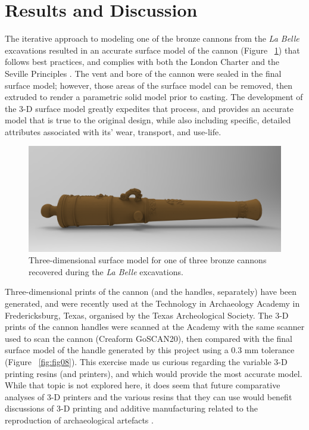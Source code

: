 \documentclass[review]{elsarticle}
\begin{document}
\section*{Results and Discussion}

The iterative approach to modeling one of the bronze cannons from the \textit{La Belle} excavations resulted in an accurate surface model of the cannon (Figure ~\ref{fig:fig07}) that follows best practices, and complies with both the London Charter \citep{RN5872} and the Seville Principles \citep{RN5873}. The vent and bore of the cannon were sealed in the final surface model; however, those areas of the surface model can be removed, then extruded to render a parametric solid model prior to casting. The development of the 3-D surface model greatly expedites that process, and provides an accurate model that is true to the original design, while also including specific, detailed attributes associated with its' wear, transport, and use-life.

\begin{figure}[ht]\centering
\includegraphics[width=\linewidth]{fig07.png}
\caption{Three-dimensional surface model for one of three bronze cannons recovered during the \textit{La Belle} excavations.}
\label{fig:fig07}
\end{figure}

Three-dimensional prints of the cannon (and the handles, separately) have been generated, and were recently used at the Technology in Archaeology Academy in Fredericksburg, Texas, organised by the Texas Archeological Society. The 3-D prints of the cannon handles were scanned at the Academy with the same scanner used to scan the cannon (Creaform GoSCAN20), then compared with the final surface model of the handle generated by this project using a 0.3 mm tolerance (Figure ~\ref{fig:fig08}). This exercise made us curious regarding the variable 3-D printing resins (and printers), and which would provide the most accurate model. While that topic is not explored here, it does seem that future comparative analyses of 3-D printers and the various resins that they can use would benefit discussions of 3-D printing and additive manufacturing related to the reproduction of archaeological artefacts \citep{RN11732}.
\end{document}
